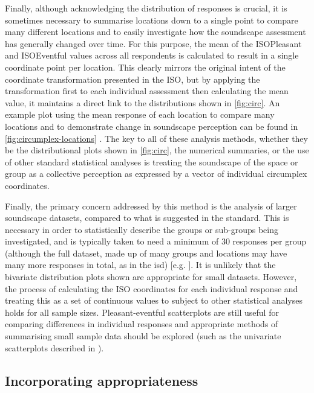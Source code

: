 Finally, although acknowledging the distribution of responses is crucial, it is sometimes necessary to summarise locations down to a single point to compare many different locations and to easily investigate how the soundscape assessment has generally changed over time. For this purpose, the mean of the ISOPleasant and ISOEventful values across all respondents is calculated to result in a single coordinate point per location. This clearly mirrors the original intent of the coordinate transformation presented in the ISO, but by applying the transformation first to each individual assessment then calculating the mean value, it maintains a direct link to the distributions shown in \cref{fig:circ}. An example plot using the mean response of each location to compare many locations and to demonstrate change in soundscape perception can be found in \cref{fig:circumplex-locations} \citep[Fig. 5]{Mitchell2021Investigating}. The key to all of these analysis methods, whether they be the distributional plots shown in \cref{fig:circ}, the numerical summaries, or the use of other standard statistical analyses is treating the soundscape of the space or group as a collective perception as expressed by a vector of individual circumplex coordinates.

Finally, the primary concern addressed by this method is the analysis of larger soundscape datasets, compared to what is suggested in the standard. This is necessary in order to statistically describe the groups or sub-groups being investigated, and is typically taken to need a minimum of 30 responses per group (although the full dataset, made up of many groups and locations may have many more responses in total, as in the \gls{isd}) [e.g. \citep{Hong2015Influence,PuyanaRomero2016Modelling}]. It is unlikely that the bivariate distribution plots shown are appropriate for small datasets. However, the process of calculating the ISO coordinates for each individual response and treating this as a set of continuous values to subject to other statistical analyses holds for all sample sizes. Pleasant-eventful scatterplots are still useful for comparing differences in individual responses and appropriate methods of summarising small sample data should be explored (such as the univariate scatterplots described in \citet{Weissgerber2015Bar}).

\subsection{Incorporating appropriateness}

